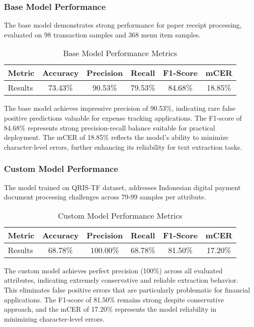 \subsubsection{Base Model Performance}
The base model demonstrates strong performance for paper receipt processing, evaluated on 98 transaction samples and 368 menu item samples.

\begin{table}[htbp]
\centering
\caption{Base Model Performance Metrics}
\label{tab:base-model}
\begin{tabular}{|l|c|c|c|c|c|}
\hline
\textbf{Metric} & \textbf{Accuracy} & \textbf{Precision} & \textbf{Recall} & \textbf{F1-Score} & \textbf{mCER} \\
\hline
Results & 73.43\% & 90.53\% & 79.53\% & 84.68\% & 18.85\% \\
\hline
\end{tabular}
\end{table}

The base model achieves impressive precision of 90.53\%, indicating rare false positive predictions valuable for expense tracking applications. The F1-score of 84.68\% represents strong precision-recall balance suitable for practical deployment. The mCER of 18.85\% reflects the model's ability to minimize character-level errors, further enhancing its reliability for text extraction tasks.

\subsubsection{Custom Model Performance}
The model trained on QRIS-TF dataset, addresses Indonesian digital payment document processing challenges across 79-99 samples per attribute.

\begin{table}[htbp]
\centering
\caption{Custom Model Performance Metrics}
\label{tab:custom-model}
\begin{tabular}{|l|c|c|c|c|c|}
\hline
\textbf{Metric} & \textbf{Accuracy} & \textbf{Precision} & \textbf{Recall} & \textbf{F1-Score} & \textbf{mCER} \\
\hline
Results & 68.78\% & 100.00\% & 68.78\% & 81.50\% & 17.20\% \\
\hline
\end{tabular}
\end{table}

The custom model achieves perfect precision (100\%) across all evaluated attributes, indicating extremely conservative and reliable extraction behavior. This eliminates false positive errors that are particularly problematic for financial applications. The F1-score of 81.50\% remains strong despite conservative approach, and the mCER of 17.20\% represents the model reliability in minimizing character-level errors.

